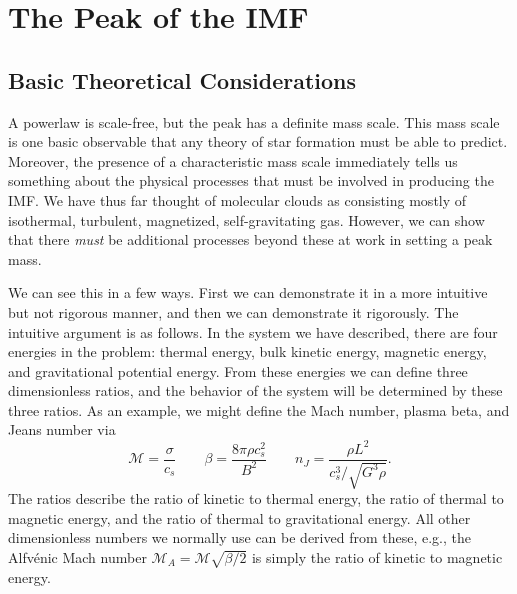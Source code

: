 \section{The Peak of the IMF}
\label{sec:imfpeak}

\subsection{Basic Theoretical Considerations}

A powerlaw is scale-free, but the peak has a definite mass scale. This mass scale is one basic observable that any theory of star formation must be able to predict. Moreover, the presence of a characteristic mass scale immediately tells us something about the physical processes that must be involved in producing the IMF. We have thus far thought of molecular clouds as consisting mostly of isothermal, turbulent, magnetized, self-gravitating gas. However, we can show that there \textit{must} be additional processes beyond these at work in setting a peak mass.

We can see this in a few ways. First we can demonstrate it in a more intuitive but not rigorous manner, and then we can demonstrate it rigorously. The intuitive argument is as follows. In the system we have described, there are four energies in the problem: thermal energy, bulk kinetic energy, magnetic energy, and gravitational potential energy. From these energies we can define three dimensionless ratios, and the behavior of the system will be determined by these three ratios. As an example, we might define the Mach number, plasma beta, and Jeans number via
\begin{equation}
\mathcal{M} = \frac{\sigma}{c_s} \qquad \beta = \frac{8\pi \rho c_s^2}{B^2}
\qquad n_J = \frac{\rho L^2}{c_s^3/\sqrt{G^3\rho}}.
\end{equation}
The ratios describe the ratio of kinetic to thermal energy, the ratio of thermal to magnetic energy, and the ratio of thermal to gravitational energy. All other dimensionless numbers we normally use can be derived from these, e.g., the Alfv\'enic Mach number $\mathcal{M}_A = \mathcal{M}\sqrt{\beta/2}$ is simply the ratio of kinetic to magnetic energy.

